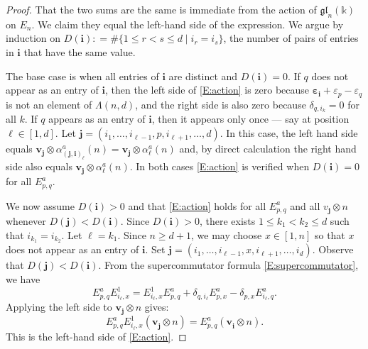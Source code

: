 \documentclass[11pt,reqno]{amsart} %
\newcommand{\gl}{\mathfrak{gl}}
\renewcommand{\k}{\mathds{k}}
\newcommand{\0}{\bar{0}}
\newcommand{\1}{\bar{1}}
\newcommand{\bv}{\mathbf{v}}
\newcommand{\bi}{\mathbf{i}}
\newcommand{\bj}{\mathbf{j}}
\newcommand{\bepsilon}{\boldsymbol{\varepsilon}}
\numberwithin{equation}{subsection}
\begin{document}
\begin{proof}  That the two sums are the same is immediate from the action of $\gl_{n}(\k )$ on $E_{n}$.  We claim they equal the left-hand side of the expression.  We argue by induction on $D(\bi): = \# \{ 1 \leq  r < s \leq d \mid i_{r}= i_{s}\}$, the number of pairs of entries in $\bi$ that have the same value.

The base case is when all entries of $\bi$ are distinct and $D(\bi ) =0$. If $q$ does not appear as an entry of $\bi$, then the left side of \eqref{E:action} is zero because $\bepsilon_{\bi}+ \varepsilon_{p}-\varepsilon_{q}$ is not an element of $\Lambda(n,d)$, and the right side is also zero because $\delta_{q,i_{k}}=0$ for all $k$.  If $q$  appears as an entry of $\bi$, then it appears only once --- say at position $\ell \in [1,d]$.  Let $\bj =(i_{1}, \dotsc , i_{\ell-1}, p, i_{\ell+1}, \dotsc , d)$.  In this case, the left hand side equals $\bv^{}_{\bj} \otimes \alpha^{a}_{(\bj , \bi)_{\ell}}(n)=\bv^{}_{\bj} \otimes \alpha^{a}_{\ell}(n)$ and, by direct calculation the right hand side also equals $\bv^{ }_{\bj } \otimes  \alpha^{a}_{\ell}(n)$.  In both cases \eqref{E:action} is verified when $D(\bi) = 0$ for all $E^{a}_{p,q}$.

We now assume $D(\bi ) > 0$ and that \eqref{E:action} holds for all $E^{a}_{p,q}$ and all $v^{}_{\bj} \otimes n$ whenever $D(\bj ) < D(\bi )$.  Since $D(\bi) > 0$, there exists $1 \leq k_{1} < k_{2} \leq d$ such that $i_{k_{1}}=i_{k_{2}}$.  Let $\ell = k_{1}$.  Since $n \geq d+1$, we may choose $x \in [1,n]$ so that $x$ does not appear as an entry of $\bi$.  Set $\bj = (i_{1}, \dotsc , i_{\ell-1}, x, i_{\ell+1}, \dotsc , i_{d})$.  Observe that $D(\bj ) < D(\bi )$.  From the supercommutator formula \eqref{E:supercommutator}, we have 
\begin{equation}\label{E:action-commutator}
E^{a}_{p,q}E^{1}_{i_{\ell}, x} =E^{1}_{i_{\ell}, x} E^{a}_{p,q} + \delta_{q, i_{\ell}} E^{a}_{p,x} - \delta_{p,x}E^{a}_{i_{\ell}, q}.
\end{equation}
Applying the left side to $\bv^{}_{\bj} \otimes n$ gives:
\[
E^{a}_{p,q}E^{1}_{i_{\ell}, x}(\bv^{}_{\bj} \otimes n) = E^{a}_{p,q}(\bv^{}_{\bi} \otimes n).
\]  This is the left-hand side of \eqref{E:action}.



\end{proof}
\end{document}
